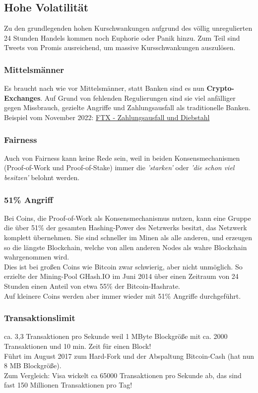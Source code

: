 \documentclass[10pt,a4paper,titlepage]{paper}
\begin{document}
\subsection{Hohe Volatilität}
Zu den grundlegenden hohen Kurschwankungen aufgrund des völlig unregulierten 24 Stunden Handels kommen noch Euphorie oder Panik hinzu. Zum Teil sind Tweets von Promis ausreichend, um massive Kursschwankungen auszulösen.
\subsubsection{Mittelsmänner}
Es braucht nach wie vor Mittelsmänner, statt Banken sind es nun \textbf{Crypto-Exchanges}. Auf Grund von fehlenden Regulierungen sind sie viel anfälliger gegen Missbrauch, gezielte Angriffe und Zahlungsausfall als traditionelle Banken.\\
Beispiel vom November 2022: \href{https://www.derstandard.at/story/2000140794202/kryptoboerse-kraken-will-mutmasslichen-ftx-hacker-identifiziert-haben}{\color{blue}FTX - Zahlungsausfall und Diebstahl}
\subsubsection{Fairness}
Auch von Fairness kann keine Rede sein, weil in beiden Konsensmechanismen (Proof-of-Work und Proof-of-Stake) immer die \textit{'starken'} oder \textit{'die schon viel besitzen'} belohnt werden.
\subsubsection{51\% Angriff} \label{51}
Bei Coins, die Proof-of-Work als Konsensmechanismus nutzen, kann eine Gruppe die über 51\% der gesamten Hashing-Power des Netzwerks besitzt, das Netzwerk komplett übernehmen. Sie sind schneller im Minen als alle anderen, und erzeugen so die längste Blockchain, welche von allen anderen Nodes als wahre Blockchain wahrgenommen wird.\\
Dies ist bei großen Coins wie Bitcoin zwar schwierig, aber nicht unmöglich. So erzielte der Mining-Pool GHash.IO im Juni 2014 über einen Zeitraum von 24 Stunden einen Anteil von etwa 55\% der Bitcoin-Hashrate.\\
Auf kleinere Coins werden aber immer wieder mit 51\% Angriffe durchgeführt. 
\subsubsection{Transaktionslimit}
ca. 3,3 Transaktionen pro Sekunde weil 1 MByte Blockgröße mit ca. 2000 Transaktionen und 10 min. Zeit für einen Block!\\
Führt im August 2017 zum Hard-Fork und der Abspaltung Bitcoin-Cash (hat nun 8 MB Blockgröße).\\
Zum Vergleich: Visa wickelt ca 65000 Transaktionen pro Sekunde ab, das sind fast 150 Millionen Transaktionen pro Tag!
\end{document}
